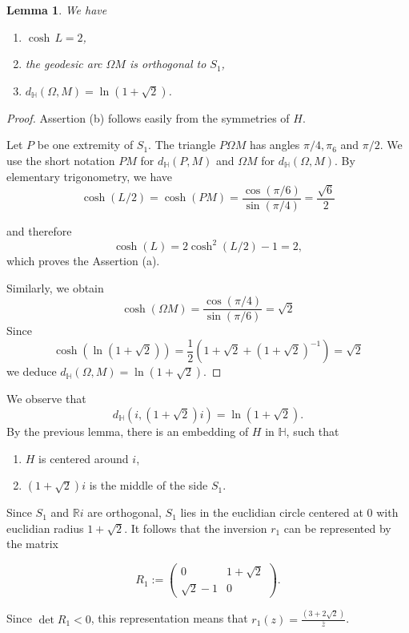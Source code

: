 \documentclass[10pt,a4paper]{amsart}
\newcommand{\HP}{\mathbb{H}}
\newcommand{\R}{\mathbb{R}}
\newtheorem{lemma}{Lemma}
\begin{document}
\begin{lemma} We have

\begin{enumerate}
\item[(a)] $\cosh\,L=2$,
\item[(b)] the geodesic arc $\Omega M$  is orthogonal to $S_1$,
\item[(c)] $d_\HP(\Omega, M)=\ln(1+\sqrt{2})$.
\end{enumerate}
\end{lemma}

\begin{proof} Assertion (b) follows easily from the symmetries of $H$. 

Let $P$ be one extremity of $S_1$. The triangle 
$P\Omega M$ has angles $\pi/4, \pi_6$ and $\pi/2$.
We use the short notation $PM$ for $d_\HP(P,M)$ and 
$\Omega M$ for $d_\HP(\Omega,M)$. By elementary trigonometry, we have
$$ \cosh(L/2)=\cosh(PM)=
\frac{\cos(\pi/6)}{\sin(\pi/4)}=\frac{\sqrt{6}}{2}$$

\noindent and therefore
$$\cosh(L)=2\cosh^2(L/2)-1=2,$$
which proves the Assertion (a).

Similarly, we obtain
$$
\cosh(\Omega M)=\frac{\cos(\pi/4)}{\sin(\pi/6)}=\sqrt{2}$$
Since 
$$\cosh(\ln(1+\sqrt{2}))= 
\frac{1}{2} (1+\sqrt{2}+(1+\sqrt{2})^{-1})=\sqrt{2}$$
we deduce $d_\HP(\Omega, M)=\ln(1+\sqrt{2}).$
\end{proof}

We observe that 
$$d_\HP(i,(1+ \sqrt{2})i)=\ln(1+\sqrt{2}).$$
By the previous lemma,  there is an embedding of $H$ in $\HP$, such that
\begin{enumerate}
\item[(a)] $H$ is centered around $i$, 
\item[(b)] $(1+\sqrt{2})i$ is the middle of the side $S_1$.
\end{enumerate}

Since $S_1$ and $\R i$ are orthogonal, $S_1$ lies
in the euclidian circle centered at $0$ with euclidian
radius $1+\sqrt{2}$.
It follows that the inversion $r_1$ can be represented by the matrix


$$R_1:=\begin{pmatrix}
0&1+\sqrt{2} \\
 \sqrt{2}-1&0
\end{pmatrix}.$$

\noindent Since $\det R_1<0$, this  representation means that $r_1(z)=\frac{(3+2\sqrt{2})}{\overline z}$.
\end{document}
